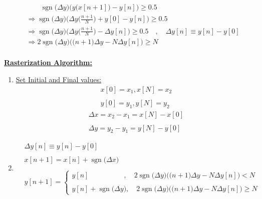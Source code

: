 \documentclass{article}
\DeclareMathOperator{\sgn}{sgn}
\begin{document}
\begin{align*}
    &\quad \quad \sgn\big(\Delta y\big)\Big(y\big(x[n + 1]\big) - y[n]\Big) \geq 0.5 \\
    &\Rightarrow \sgn\big(\Delta y\big)\Bigg(\Delta y\bigg(\frac{n + 1}{N}\bigg) + y[0] - y[n]\Bigg) \geq 0.5 \\
    &\Rightarrow \sgn\big(\Delta y\big)\Bigg(\Delta y\bigg(\frac{n + 1}{N}\bigg) - \Delta y[n]\Bigg) \geq 0.5 \quad, \quad \Delta y[n] \equiv y[n] - y[0] \\ 
    &\Rightarrow 2\sgn\big(\Delta y\big)\Bigg(\big(n + 1\big)\Delta y - N\Delta y[n]\Bigg) \geq N \\
\end{align*}

\underline{\textbf{Rasterization Algorithm:}} \\
\begin{enumerate}
    \item \underline{Set Initial and Final values:}
           \begin{align*}
                x[0] = x_{1}, x[N] = x_{2} \\ \\
                y[0] = y_{1}, y[N] = y_{2}
             \end{align*}
           \begin{align*}     
                \Delta x = x_{2} - x_{1} = x[N] - x[0] \\ \\
                \Delta y = y_{2} - y_{1} = y[N] - y[0] 
             \end{align*}
    \item {} 
           \begin{align*}
                &\Delta y[n] \equiv y[n] - y[0] \\ \\ 
                &x[n + 1] = x[n] + \sgn\big(\Delta x\big) \\ \\ 
                &y[n + 1] = \begin{cases}
                                y[n] \quad \quad \quad \quad \quad, \quad 2\sgn\big(\Delta y\big)\Bigg(\big(n + 1\big)\Delta y - N\Delta y[n]\Bigg) < N \\ \\
                                y[n] + \sgn\big(\Delta y\big), \quad 2\sgn\big(\Delta y\big)\Bigg(\big(n + 1\big)\Delta y - N\Delta y[n]\Bigg) \geq N 
                              \end{cases} 
            \end{align*}
\end{enumerate}
\end{document}
